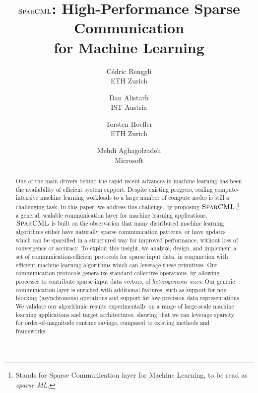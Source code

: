 \documentclass[11pt]{article}
\date{}
\newcommand{\mml}{$\textsc{SparCML}$}
\begin{document}
\title{\mml{}: High-Performance Sparse Communication \\ for Machine Learning}

\author{
{\rm C\'edric Renggli}\\
ETH Zurich
\and
{\rm Dan Alistarh}\\
IST Austria
\and 
{\rm Torsten Hoefler}\\
ETH Zurich
\and 
{\rm Mehdi Aghagolzadeh}\\
Microsoft
} %



\maketitle

\begin{abstract}
	\noindent
	One of the main drivers behind the rapid recent advances in machine
	learning has been the availability of efficient system support. 
	Despite existing progress, scaling compute-intensive machine learning
	workloads to a large number of compute nodes is still a challenging
	task. 
	In this paper, we address this challenge, by proposing
	\mml{},\footnote{Stands for Sparse Communication layer for Machine
		Learning, to be read as \emph{sparse ML}.} a general, scalable
	communication layer for machine learning applications. 
	\mml{} is built on the observation that many distributed machine
	learning algorithms either have naturally sparse communication
	patterns, or have updates which can be sparsified in a structured way
	for improved performance, without loss of convergence or accuracy.  
	To exploit this insight, we analyze, design, and implement a set of
	communication-efficient protocols for sparse input data, in
	conjunction with efficient machine learning algorithms which can
	leverage these primitives. 
	Our communication protocols generalize standard collective operations,
	by allowing processes to contribute sparse input data vectors, of
	\emph{heterogeneous sizes}. 
	Our generic communication layer is enriched with additional features,
	such as support for non-blocking (asynchronous) operations and support
	for low-precision data representations. 
	We validate our algorithmic results experimentally on a range of
	large-scale machine learning applications and target architectures,
	showing that we can leverage sparsity for order-of-magnitude runtime
	savings, compared to existing methods and frameworks. 
\end{abstract}
\end{document}

